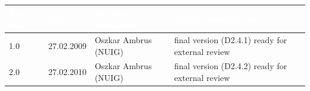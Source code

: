 \documentclass{fast_latex}
\newcommand\authorOne{Oszkar Ambrus (NUIG)}
\newcommand\authorTwo{Albert Zuendorf (UniKassel)}
\begin{document}
\begin{small}
\begin{tabular}{|l|l|l|p{7.5cm}|}
\hline
\rowcolor{fast@lightgrey}\textcolor{white}{\textbf{Rev. No.}} &
                            \textcolor{white}{\textbf{Date}} &
                            \textcolor{white}{\textbf{Author (Partner)}} &
                            \textcolor{white}{\textbf{Change description}}\\ \hline
1.0 & 27.02.2009 & \authorOne & final version (D2.4.1) ready for external review \\ \hline
2.0 & 27.02.2010 & \authorOne & final version (D2.4.2) ready for external review \\ \hline
\end{tabular}
\end{small}

\color{black}

\vfill
\end{document}
